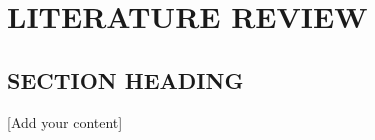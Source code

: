 
\chapter{\centering \textbf{\MakeUppercase{Literature Review}}}

\section{\textbf{\MakeUppercase{Section Heading}}}
[Add your content]

